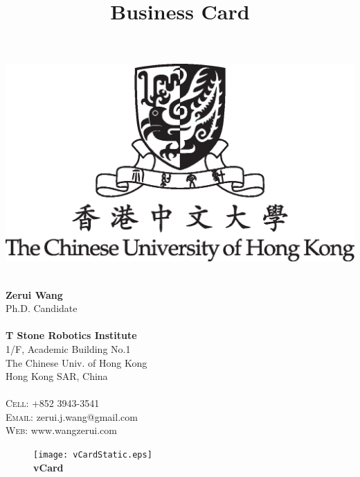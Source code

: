 \documentclass[11pt,a4paper]{memoir}
\title{Business Card}
\makeatletter
\def\Who     {Zerui Wang}
\def\CityZip {Hong Kong SAR, China}
\def\Email   {zerui.j.wang@gmail.com}
\def\TEL     {+852 3943-3541}
\def\WEB     {www.wangzerui.com}
\makeatother
\begin{document}

\begin{Spacing}{1.00}
\noindent
\tiny
\hspace{2.7mm}
\begin{minipage}{0.42\textwidth}
\begin{center}
\includegraphics[width=1.0\linewidth]{cuhk_centre_logo}
\end{center}
\end{minipage}
%
\hspace{5.0mm}
%
\begin{minipage}{0.55\textwidth}
\hspace{0.1em} \\
\textbf{\Who} \\
Ph.D. Candidate \\ 
\hspace{0.5em} \\
\textbf{T Stone Robotics Institute} \\
1/F, Academic Building No.1 \\
The Chinese Univ. of Hong Kong \\
\CityZip\\
\hspace{0.2em} \\
\textsc{Cell:} \hspace{0em} \TEL \\
\textsc{Email:} \Email \\
\textsc{Web:} \hspace{0.25em} \WEB \\
\end{minipage}

\vspace{1em}

\end{Spacing}

\newpage

\begin{figure}
\tiny
\centering
\texttt{[image: vCardStatic.eps]}\\
\vspace{-2mm}
\textbf{vCard}
\end{figure}
\end{document}
